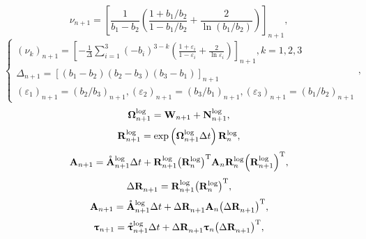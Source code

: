 \begin{equation}
{\nu _{n + 1}} = {\left[ {\frac{1}{{{b_1} - {b_2}}}\left( {\frac{{1 + {b_1}/{b_2}}}{{1 - {b_1}/{b_2}}} + \frac{2}{{\ln \left( {{b_1}/{b_2}} \right)}}} \right)} \right]_{n + 1}},
\end{equation}
\begin{equation}
\left\{ {\begin{array}{*{20}{l}}
{{{\left( {{\nu _k}} \right)}_{n + 1}} = {{\left[ { - \frac{1}{\Delta }\sum\limits_{i = 1}^3 {{{\left( { - {b_i}} \right)}^{3 - k}}\left( {\frac{{1 + {\varepsilon _i}}}{{1 - {\varepsilon _i}}} + \frac{2}{{\ln {\varepsilon _i}}}} \right)} } \right]}_{n + 1}},k = 1,2,3}\\
{{\Delta _{n + 1}} = {{\left[ {\left( {{b_1} - {b_2}} \right)\left( {{b_2} - {b_3}} \right)\left( {{b_3} - {b_1}} \right)} \right]}_{n + 1}}}\\
{{{\left( {{\varepsilon _1}} \right)}_{n + 1}} = {{\left( {{b_2}/{b_3}} \right)}_{n + 1}},{{\left( {{\varepsilon _2}} \right)}_{n + 1}} = {{\left( {{b_3}/{b_1}} \right)}_{n + 1}},{{\left( {{\varepsilon _3}} \right)}_{n + 1}} = {{\left( {{b_1}/{b_2}} \right)}_{n + 1}}}
\end{array}} \right.
,
\end{equation}
\begin{equation}
{\bm{\Omega}}_{n + 1}^{\log } = {{\bf{W}}_{n + 1}} + {\bf{N}}_{n + 1}^{\log },
\end{equation}
\begin{equation}
{\bf{R}}_{n + 1}^{\log } = \exp \left( {{\bm{\Omega}}_{n + 1}^{\log }\Delta t} \right){\bf{R}}_n^{\log },
\end{equation}
\begin{equation}
{{\bf{A}}_{n + 1}} = \mathring {\mathbf{A}}_{n + 1}^{\log }\Delta t + {\bf{R}}_{n + 1}^{\log }{\left( {{\bf{R}}_n^{\log }} \right)^{\rm{T}}}{{\bf{A}}_n}{\bf{R}}_n^{\log }{\left( {{\bf{R}}_{n + 1}^{\log }} \right)^{\rm{T}}},
\end{equation}
\begin{equation}
\Delta {\bf{R}}_{n + 1}^{} = {\bf{R}}_{n + 1}^{\log }{\left( {{\bf{R}}_n^{\log }} \right)^{\rm{T}}},
\end{equation}
\begin{equation}
{{\bf{A}}_{n + 1}} = \mathring {\mathbf{A}}_{n + 1}^{\log } \Delta t + \Delta {\bf{R}}_{n + 1}^{}{{\bf{A}}_n}{\left( {\Delta {\bf{R}}_{n + 1}^{}} \right)^{\rm{T}}},
\end{equation}
\begin{equation}
{{\bm{\uptau }}_{n + 1}} = \mathring {\bm{\uptau}}_{n + 1}^{\log }\Delta t + \Delta {\mathbf{R}}_{n + 1}^{}{{\bm{\uptau }}_n}{\left( {\Delta {\mathbf{R}}_{n + 1}^{}} \right)^{\rm{T}}},
\end{equation}
